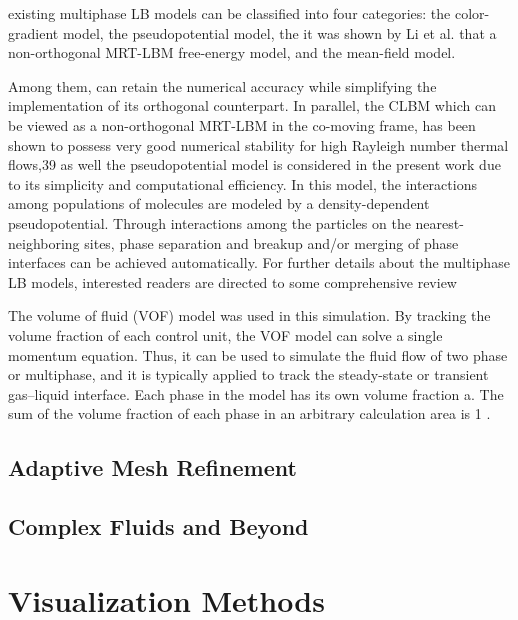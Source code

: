 existing multiphase LB models can be classified into four categories: the color-gradient model, the pseudopotential model, the it was shown by Li et al. that a non-orthogonal MRT-LBM free-energy model, and the mean-field model.
%

Among them, can retain the numerical accuracy while simplifying the implementation of its orthogonal counterpart. In parallel, the CLBM which can be viewed as a non-orthogonal MRT-LBM in the co-moving frame, has been shown to possess very good numerical stability for high Rayleigh number thermal flows,39 as well the pseudopotential model is considered in the present work due to its simplicity and computational efficiency. In this model, the interactions among populations of molecules are modeled by a density-dependent pseudopotential. Through interactions among the particles on the nearest-neighboring sites, phase separation and breakup and/or merging of phase interfaces can be achieved automatically. For further details about the multiphase LB models, interested readers are directed to some comprehensive review

The volume of fluid (VOF) model was used in this simulation. By tracking the volume fraction of each control unit, the VOF model can solve a single momentum equation. Thus, it can be used to simulate the fluid flow of two phase or multiphase, and it is typically applied to track the steady-state or transient gas–liquid interface.
Each phase in the model has its own volume fraction a. The sum of the volume fraction of each phase in an arbitrary calculation area is 1 \cite{lvSimulationFlowFluid}.
%

\subsection{Adaptive Mesh Refinement}

\subsection{Complex Fluids and Beyond}


\section{Visualization Methods}

